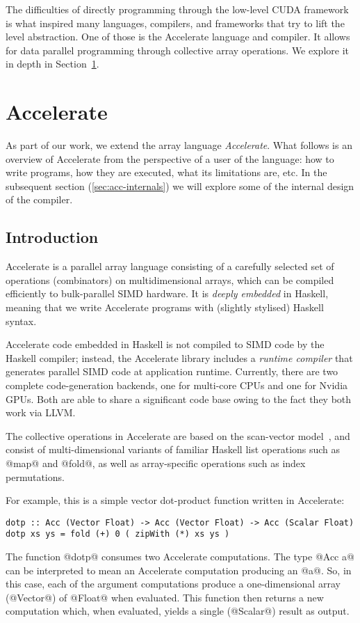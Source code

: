 The difficulties of directly programming through the low-level CUDA framework is what inspired many languages, compilers, and frameworks that try to lift the level abstraction. One of those is the Accelerate language and compiler. It allows for data parallel programming through collective array operations. We explore it in depth in Section~\ref{sec:background-accelerate}.

\section{Accelerate}
\label{sec:background-accelerate}

As part of our work, we extend the array language \emph{Accelerate}. What follows is an overview of Accelerate from the perspective of a user of the language: how to write programs, how they are executed, what its limitations are, etc. In the subsequent section (\ref{sec:acc-internals}) we will explore some of the internal design of the compiler.

\subsection{Introduction}
\label{sec:acc-intro}

Accelerate is a parallel array language consisting of a carefully selected set of operations (combinators) on multidimensional arrays, which can be compiled efficiently to bulk-parallel SIMD hardware. It is \emph{deeply embedded} in Haskell, meaning that we write Accelerate programs with (slightly stylised) Haskell syntax.

Accelerate code embedded in Haskell is not compiled to SIMD code by the Haskell compiler; instead, the Accelerate library includes a \emph{runtime compiler} that generates parallel SIMD code at application runtime. Currently, there are two complete code-generation backends, one for multi-core CPUs and one for Nvidia GPUs. Both are able to share a significant code base owing to the fact they both work via LLVM.

The collective operations in Accelerate are based on the scan-vector model~\citep{Chatterjee:1990vj,Sengupta:2007tc}, and consist of multi-dimensional variants of familiar Haskell list operations such as @map@ and @fold@, as well as array-specific operations such as index permutations.

For example, this is a simple vector dot-product function written in Accelerate:
%
\begin{lstlisting}
dotp :: Acc (Vector Float) -> Acc (Vector Float) -> Acc (Scalar Float)
dotp xs ys = fold (+) 0 ( zipWith (*) xs ys )
\end{lstlisting}
%
The function @dotp@ consumes two Accelerate computations. The type @Acc a@ can be interpreted to mean an Accelerate computation producing an @a@. So, in this case, each of the argument computations produce a one-dimensional array (@Vector@) of @Float@ when evaluated. This function then returns a new computation which, when evaluated, yields a single (@Scalar@) result as output.

